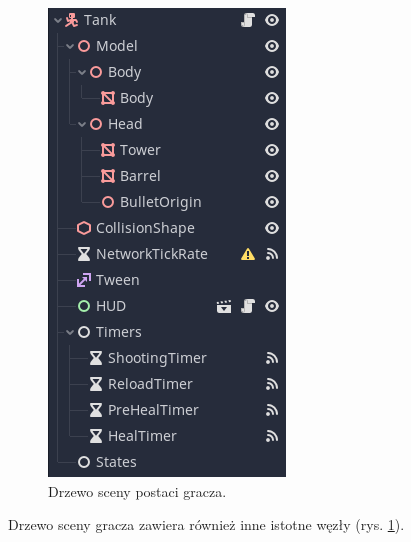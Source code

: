 \begin{figure}
    \centering
    \includegraphics[width=.6\linewidth]{Images/development/tank_tree.png}
    \caption{Drzewo sceny postaci gracza.}
    \label{fig:player_scene_tree}
\end{figure}

Drzewo sceny gracza zawiera również inne istotne węzły (rys. \ref{fig:player_scene_tree}).

